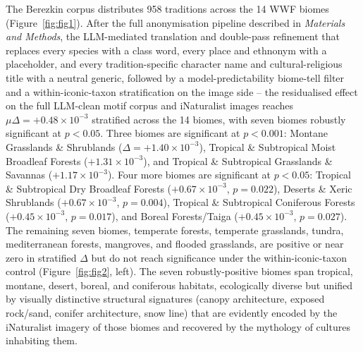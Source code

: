 \documentclass[11pt,a4paper]{article}
\begin{document}
The Berezkin corpus distributes 958 traditions across the 14 WWF
biomes (Figure~\ref{fig:fig1}). After the full anonymisation pipeline
described in \emph{Materials and Methods}, the LLM-mediated
translation and double-pass refinement that replaces every species
with a class word, every place and ethnonym with a placeholder, and
every tradition-specific character name and cultural-religious title
with a neutral generic, followed by a model-predictability biome-tell
filter and a within-iconic-taxon stratification on the image side --
the residualised effect on the full LLM-clean motif corpus and
iNaturalist images reaches
$\mu\Delta = +0.48\times 10^{-3}$ stratified across the 14 biomes,
with seven biomes robustly significant at $p<0.05$. Three biomes
are significant at $p<0.001$: Montane Grasslands \& Shrublands
($\Delta = +1.40\times 10^{-3}$), Tropical \& Subtropical Moist
Broadleaf Forests ($+1.31\times 10^{-3}$), and Tropical \&
Subtropical Grasslands \& Savannas ($+1.17\times 10^{-3}$). Four
more biomes are significant at $p<0.05$: Tropical \& Subtropical
Dry Broadleaf Forests ($+0.67\times 10^{-3}$, $p=0.022$), Deserts
\& Xeric Shrublands ($+0.67\times 10^{-3}$, $p=0.004$), Tropical
\& Subtropical Coniferous Forests ($+0.45\times 10^{-3}$,
$p=0.017$), and Boreal Forests/Taiga ($+0.45\times 10^{-3}$,
$p=0.027$). The remaining seven biomes, temperate forests,
temperate grasslands, tundra, mediterranean forests, mangroves,
and flooded grasslands, are positive or near zero in stratified
$\Delta$ but do not reach significance under the
within-iconic-taxon control (Figure~\ref{fig:fig2}, left). The
seven robustly-positive biomes span tropical, montane, desert,
boreal, and coniferous habitats, ecologically diverse but
unified by visually distinctive structural signatures (canopy
architecture, exposed rock/sand, conifer architecture, snow line)
that are evidently encoded by the iNaturalist imagery of those
biomes and recovered by the mythology of cultures inhabiting
them.
\end{document}
